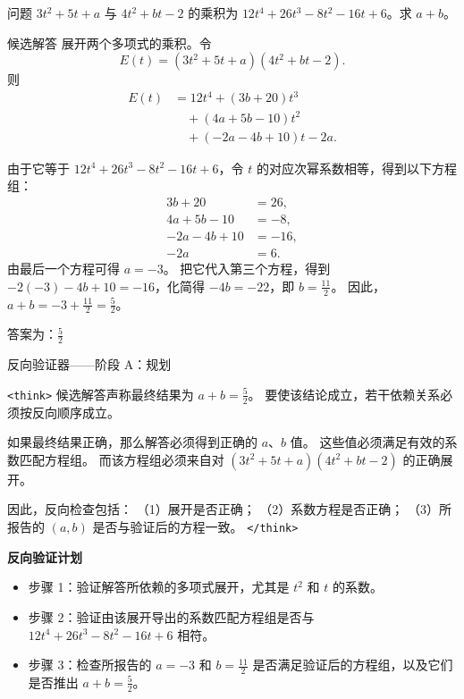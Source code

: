 \documentclass[11pt]{article}
\begin{document}
\begin{exbox}{问题}
$3t^2+5t+a$ 与 $4t^2+bt-2$ 的乘积为 $12t^4+26t^3-8t^2-16t+6$。求 $a+b$。
\end{exbox}

\begin{exbox}{候选解答}
展开两个多项式的乘积。令
\[
E(t)=(3t^2+5t+a)(4t^2+bt-2).
\]
则
\[
\begin{aligned}
E(t)
&= 12t^4 + (3b+20)t^3 \\
&\quad + (4a+5b-10)t^2 \\
&\quad + (-2a-4b+10)t - 2a.
\end{aligned}
\]

由于它等于 $12t^4+26t^3-8t^2-16t+6$，令 $t$ 的对应次幂系数相等，得到以下方程组：
\begin{align*}
3b+20 &= 26, \\
4a+5b-10 &= -8, \\
-2a-4b+10 &= -16, \\
-2a &= 6.
\end{align*}
由最后一个方程可得 $a=-3$。
把它代入第三个方程，得到 $-2(-3)-4b+10=-16$，化简得 $-4b=-22$，即 $b=\frac{11}{2}$。
因此，$a+b=-3+\frac{11}{2}=\boxed{\frac{5}{2}}$。

答案为：$\frac{5}{2}$

\end{exbox}

\begin{exbox}{反向验证器——阶段 A：规划}

\texttt{<think>}
候选解答声称最终结果为 $a+b=\frac{5}{2}$。
要使该结论成立，若干依赖关系必须按反向顺序成立。

如果最终结果正确，那么解答必须得到正确的 $a$、$b$ 值。
这些值必须满足有效的系数匹配方程组。
而该方程组必须来自对 $(3t^2+5t+a)(4t^2+bt-2)$ 的正确展开。

因此，反向检查包括：
（1）展开是否正确；
（2）系数方程是否正确；
（3）所报告的 $(a,b)$ 是否与验证后的方程一致。
\texttt{</think>}

\noindent
\textbf{反向验证计划}
\begin{itemize}
  \item 步骤 1：验证解答所依赖的多项式展开，尤其是 $t^2$ 和 $t$ 的系数。
  \item 步骤 2：验证由该展开导出的系数匹配方程组是否与 $12t^4+26t^3-8t^2-16t+6$ 相符。
  \item 步骤 3：检查所报告的 $a=-3$ 和 $b=\frac{11}{2}$ 是否满足验证后的方程组，以及它们是否推出 $a+b=\frac{5}{2}$。
\end{itemize}

\end{exbox}
\end{document}
